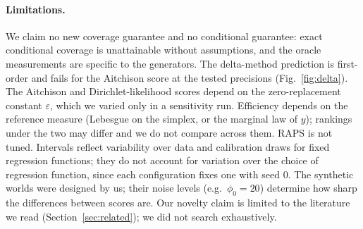 \paragraph{Limitations.} We claim no new coverage guarantee and no conditional guarantee: exact conditional coverage is unattainable without assumptions, and the oracle measurements are specific to the generators. The delta-method prediction is first-order and fails for the Aitchison score at the tested precisions (Fig.~\ref{fig:delta}). The Aitchison and Dirichlet-likelihood scores depend on the zero-replacement constant $\varepsilon$, which we varied only in a sensitivity run. Efficiency depends on the reference measure (Lebesgue on the simplex, or the marginal law of $y$); rankings under the two may differ and we do not compare across them. RAPS is not tuned. Intervals reflect variability over data and calibration draws for fixed regression functions; they do not account for variation over the choice of regression function, since each configuration fixes one with seed $0$. The synthetic worlds were designed by us; their noise levels (e.g.\ $\phi_0=20$) determine how sharp the differences between scores are. Our novelty claim is limited to the literature we read (Section~\ref{sec:related}); we did not search exhaustively.
